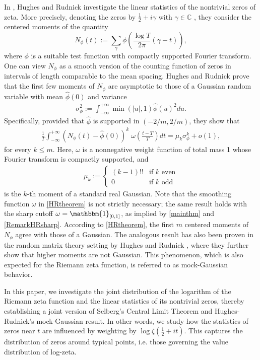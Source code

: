 \documentclass[12pt,oneside,english,a4paper]{amsart}
\theoremstyle{remark}
\numberwithin{equation}{section}
\begin{document}
In \cite{HughesRudnick}, Hughes and Rudnick investigate the linear statistics of the nontrivial zeros of zeta. More precisely, 
denoting the zeros by $\frac12+i\gamma$ with $\gamma\in\mathbb C$
, they consider the centered moments of the quantity
$$ N_{\phi}(t) := \sum_{\gamma} \phi \left( \frac{\log T}{2\pi}(\gamma - t) \right), $$
where $\phi$ is a suitable test function with compactly supported Fourier transform.
One can view $N_\phi$ as a smooth
version of the counting function of zeros in intervals of length comparable to the mean spacing. Hughes and Rudnick prove that the first few moments of $N_\phi$ are asymptotic to those of a Gaussian random variable with mean $\hat\phi(0)$ and variance
\begin{align}\label{3june.1}
    \sigma_\phi^2 := \int_{-\infty}^{+\infty} \min(|u|,1) \hat\phi(u)^2 du.
\end{align}
Specifically, provided that $\hat\phi$ is supported in $(-2/m,2/m)$, they show that
\begin{align}\label{HRtheorem}
    \frac{1}{T} \int_{-\infty}^{+\infty} (N_\phi(t)-\hat\phi(0))^k \; \omega \left(\frac{t-T}{T} \right) dt 
    = \mu_k \sigma_\phi^{k} + o(1),
\end{align}
for every $k\leq m$. Here, $\omega$ is a nonnegative weight function of total mass 1 whose Fourier transform is compactly supported, and
\begin{align}\label{3june.2}
\mu_k := \begin{cases} (k-1)!! & \text{if } k \text{ even} \\ 0 & \text{if } k \text{ odd} \end{cases}
\end{align}
is the $k$-th moment of a standard real Gaussian. Note that the smoothing function $\omega$ in \eqref{HRtheorem} is not strictly necessary; the same result holds with the sharp cutoff $\omega = \mathbbm{1}_{[0,1]}$, as implied by \cref{mainthm} and \cref{RemarkHRsharp}.
According to \eqref{HRtheorem}, the first $m$ centered moments of $N_\phi$ agree with those of a Gaussian. The analogous result has also been proven in the random matrix theory setting by Hughes and Rudnick \cite{HughesRudnick2}, where they further show that higher moments are not Gaussian. %
This phenomenon, which is also expected for the Riemann zeta function, is referred to as mock-Gaussian behavior.

In this paper, we investigate the joint distribution of the logarithm of the Riemann zeta function and the linear statistics of its nontrivial zeros, thereby establishing a joint version of Selberg's Central Limit Theorem and Hughes-Rudnick's mock-Gaussian result. In other words, we study how the statistics of zeros near $t$ are influenced by weighting by $\log\zeta(\frac12+it)$. This captures the distribution of zeros around typical points, i.e. those governing the value distribution of log-zeta.
\end{document}
